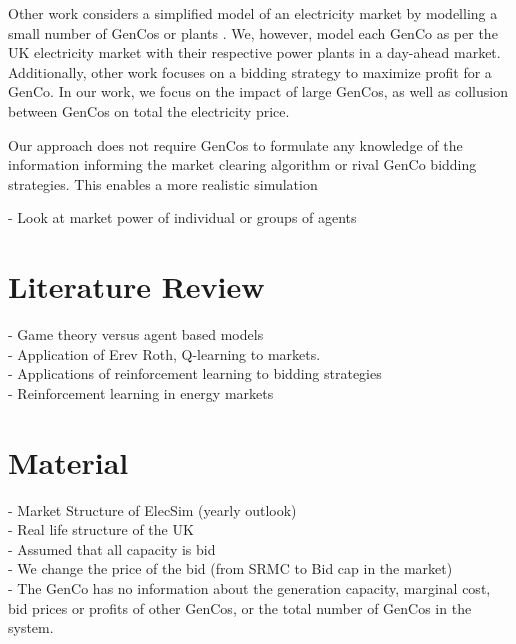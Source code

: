 \documentclass[conference]{IEEEtran}
\begin{document}
Other work considers a simplified model of an electricity market by modelling a small number of GenCos or plants \cite{EsmaeiliAliabadi2017}. We, however, model each GenCo as per the UK electricity market with their respective power plants in a day-ahead market. Additionally, other work focuses on a bidding strategy to maximize profit for a GenCo. In our work, we focus on the impact of large GenCos, as well as collusion between GenCos on total the electricity price. 


Our approach does not require GenCos to formulate any knowledge of the information informing the market clearing algorithm or rival GenCo bidding strategies. This enables a more realistic simulation














- Look at market power of individual or groups of agents





\section{Literature Review}

- Game theory versus agent based models\\

- Application of Erev Roth, Q-learning to markets.\\

- Applications of reinforcement learning to bidding strategies \\
- Reinforcement learning in energy markets \\


\section{Material}

- Market Structure of ElecSim (yearly outlook) \\
- Real life structure of the UK\\
- Assumed that all capacity is bid\\
- We change the price of the bid (from SRMC to Bid cap in the market)\\
- The GenCo has no information about the generation capacity, marginal cost, bid prices or profits of other GenCos, or the total number of GenCos in the system. \cite{EsmaeiliAliabadi2017}\\
\end{document}
